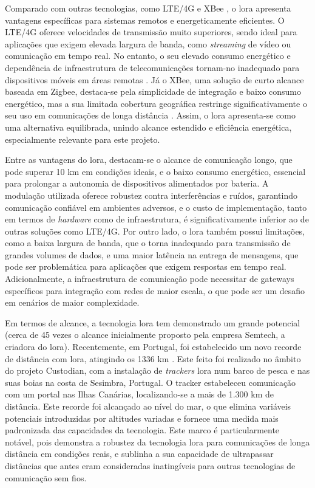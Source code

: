 Comparado com outras tecnologias, como LTE/4G e XBee \cite{digi-xbee}, o \gls{lora} apresenta vantagens específicas para sistemas remotos e energeticamente eficientes. O LTE/4G oferece velocidades de transmissão muito superiores, sendo ideal para aplicações que exigem elevada largura de banda, como \textit{streaming} de vídeo ou comunicação em tempo real. No entanto, o seu elevado consumo energético e dependência de infraestrutura de telecomunicações tornam-no inadequado para dispositivos móveis em áreas remotas \cite{bivocom-lte-vs-lora}. Já o XBee, uma solução de curto alcance baseada em Zigbee, destaca-se pela simplicidade de integração e baixo consumo energético, mas a sua limitada cobertura geográfica restringe significativamente o seu uso em comunicações de longa distância \cite{digi-xbee-specs, xbee-range-comparison}. Assim, o \gls{lora} apresenta-se como uma alternativa equilibrada, unindo alcance estendido e eficiência energética, especialmente relevante para este projeto.

Entre as vantagens do \gls{lora}, destacam-se o alcance de comunicação longo, que pode superar 10 km em condições ideais, e o baixo consumo energético, essencial para prolongar a autonomia de dispositivos alimentados por bateria. A modulação utilizada oferece robustez contra interferências e ruídos, garantindo comunicação confiável em ambientes adversos, e o custo de implementação, tanto em termos de \emph{hardware} como de infraestrutura, é significativamente inferior ao de outras soluções como LTE/4G. Por outro lado, o \gls{lora} também possui limitações, como a baixa largura de banda, que o torna inadequado para transmissão de grandes volumes de dados, e uma maior latência na entrega de mensagens, que pode ser problemática para aplicações que exigem respostas em tempo real. Adicionalmente, a infraestrutura de comunicação pode necessitar de gateways específicos para integração com redes de maior escala, o que pode ser um desafio em cenários de maior complexidade.

Em termos de alcance, a tecnologia \gls{lora} tem demonstrado um grande potencial (cerca de 45 vezes o alcance inicialmente proposto pela empresa Semtech, a criadora do \gls{lora}). Recentemente, em Portugal, foi estabelecido um novo recorde de distância com \gls{lora}, atingindo os 1336 km \cite{pplware-lora}. Este feito foi realizado no âmbito do projeto Custodian, com a instalação de \emph{trackers} \gls{lora} num barco de pesca e nas suas boias na costa de Sesimbra, Portugal. O tracker estabeleceu comunicação com um portal nas Ilhas Canárias, localizando-se a mais de 1.300 km de distância. Este recorde foi alcançado ao nível do mar, o que elimina variáveis potenciais introduzidas por altitudes variadas e fornece uma medida mais padronizada das capacidades da tecnologia. Este marco é particularmente notável, pois demonstra a robustez da tecnologia \gls{lora} para comunicações de longa distância em condições reais, e sublinha a sua capacidade de ultrapassar distâncias que antes eram consideradas inatingíveis para outras tecnologias de comunicação sem fios.

